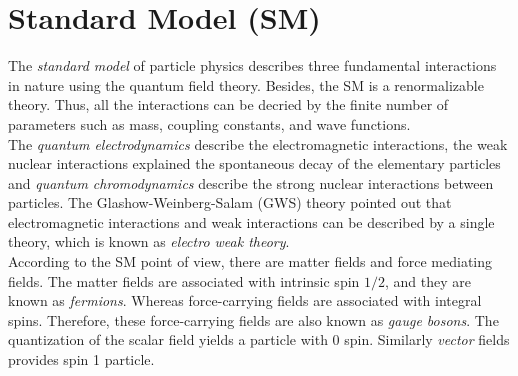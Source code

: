 \section{Standard Model (SM)}
The \textit{standard model} of particle physics describes three fundamental interactions in nature using the quantum field theory. Besides, the SM is a renormalizable theory. Thus, all the interactions can be decried by the finite number of parameters such as mass, coupling constants, and wave functions.\\
The \textit{quantum electrodynamics} describe the electromagnetic interactions, the weak nuclear interactions explained the spontaneous decay of the elementary particles and \textit{quantum chromodynamics } describe the strong nuclear interactions between particles. The Glashow-Weinberg-Salam (GWS) theory \cite{Glashow:1961tr, Weinberg:1967tq} pointed out that electromagnetic interactions and weak interactions can be described by a single theory, which is known as \textit{electro weak theory}.\\
According to the SM point of view, there are matter fields and force mediating fields. The matter fields are associated with intrinsic spin $1/2$, and they are known as \textit{fermions}. Whereas force-carrying fields are associated with integral spins. Therefore, these force-carrying fields are also known as \textit{gauge bosons}. The quantization of the scalar field yields a particle with $0$ spin. Similarly \textit{vector} fields provides spin 1 particle.\\  

